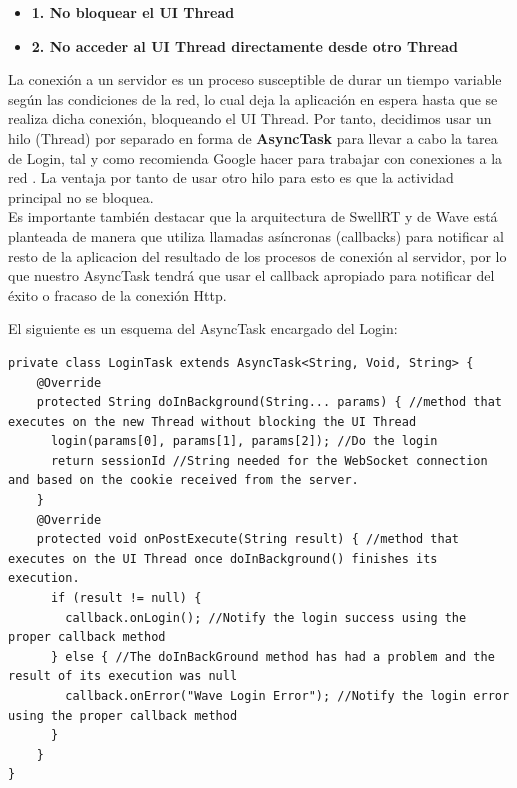 	  \begin{itemize}
	  	\item \textbf{1. No bloquear el UI Thread}
	  	\item \textbf{2. No acceder al UI Thread directamente desde otro Thread}
	  \end{itemize}
	  
	  La conexión a un servidor es un proceso susceptible de durar un tiempo variable según las condiciones de la red, lo cual deja la aplicación en espera hasta que se realiza dicha conexión,  bloqueando el UI Thread. Por tanto, decidimos usar un hilo (Thread) por separado en forma de \textbf{AsyncTask} \cite{ref:android:asynctask} para llevar a cabo la tarea de Login, tal y como recomienda Google hacer para trabajar con conexiones a la red \cite{ref:android_networking}. La ventaja por tanto de usar otro hilo para esto es que la actividad principal no se bloquea. \\[.2cm]
	  	 
	 Es importante también destacar que la arquitectura de SwellRT y de Wave está planteada de manera que utiliza llamadas asíncronas (callbacks) para notificar al resto de la aplicacion del resultado de los procesos de conexión al servidor, por lo que nuestro AsyncTask tendrá que usar el callback apropiado para notificar del éxito o fracaso de la conexión Http.
	 
	  El siguiente es un esquema del AsyncTask encargado del Login: \\[.2cm]
	  
	  \begin{lstlisting}[frame=single]	  
private class LoginTask extends AsyncTask<String, Void, String> {
    @Override
    protected String doInBackground(String... params) { //method that executes on the new Thread without blocking the UI Thread
      login(params[0], params[1], params[2]); //Do the login 
      return sessionId //String needed for the WebSocket connection and based on the cookie received from the server.     
    }
    @Override
    protected void onPostExecute(String result) { //method that executes on the UI Thread once doInBackground() finishes its execution.    
      if (result != null) { 
        callback.onLogin(); //Notify the login success using the proper callback method
      } else { //The doInBackGround method has had a problem and the result of its execution was null
        callback.onError("Wave Login Error"); //Notify the login error using the proper callback method
      }
    }
}    
	  \end{lstlisting} 
	  
